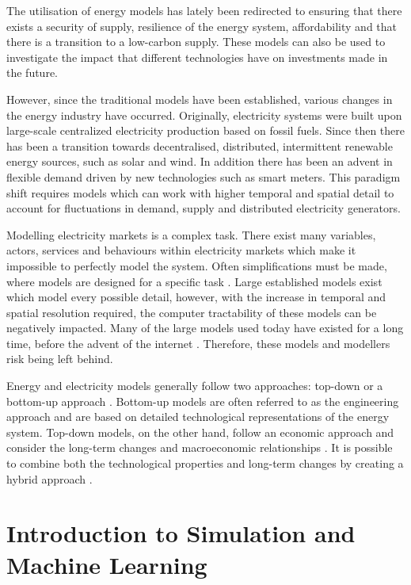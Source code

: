The utilisation of energy models has lately been redirected to ensuring that there exists a security of supply, resilience of the energy system, affordability and that there is a transition to a low-carbon supply. These models can also be used to investigate the impact that different technologies have on investments made in the future. 

However, since the traditional models have been established, various changes in the energy industry have occurred. Originally, electricity systems were built upon large-scale centralized electricity production based on fossil fuels. Since then there has been a transition towards decentralised, distributed, intermittent renewable energy sources, such as solar and wind. In addition there has been an advent in flexible demand driven by new technologies such as smart meters. This paradigm shift requires models which can work with higher temporal and spatial detail to account for fluctuations in demand, supply and distributed electricity generators.

Modelling electricity markets is a complex task. There exist many variables, actors, services and behaviours within electricity markets which make it impossible to perfectly model the system. Often simplifications must be made, where models are designed for a specific task \cite{Pfenninger2014a}. Large established models exist which model every possible detail, however, with the increase in temporal and spatial resolution required, the computer tractability of these models can be negatively impacted. Many of the large models used today have existed for a long time, before the advent of the internet \cite{Pfenninger2014a}. Therefore, these models and modellers risk being left behind.

Energy and electricity models generally follow two approaches: top-down or a bottom-up approach \cite{Ringkjob2018}. Bottom-up models are often referred to as the engineering approach and are based on detailed technological representations of the energy system. Top-down models, on the other hand, follow an economic approach and consider the long-term changes and macroeconomic relationships \cite{Mai2013}. It is possible to combine both the technological properties and long-term changes by creating a hybrid approach \cite{Fortes2014}.




\section{Introduction to Simulation and Machine Learning}
\label{sec:intro:simulationmodelling}

